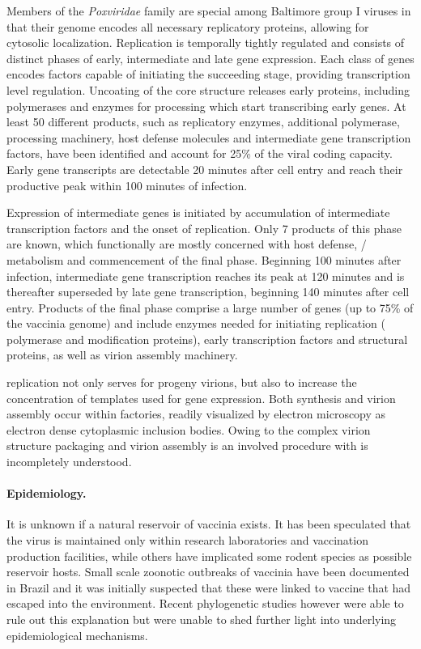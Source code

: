 Members of the \textit{Poxviridae} family are special among Baltimore group I viruses in that their genome encodes all necessary replicatory proteins, allowing for cytosolic localization. Replication is temporally tightly regulated and consists of distinct phases of early, intermediate and late gene expression. Each class of genes encodes factors capable of initiating the succeeding stage, providing transcription level regulation. Uncoating of the core structure releases early proteins, including  polymerases and enzymes for  processing which start transcribing early genes. At least 50 different products, such as  replicatory enzymes, additional  polymerase,  processing machinery, host defense molecules and intermediate gene transcription factors, have been identified and account for 25\% of the viral coding capacity. Early gene transcripts are detectable 20 minutes after cell entry and reach their productive peak within 100 minutes of infection.

Expression of intermediate genes is initiated by accumulation of intermediate  transcription factors and the onset of  replication. Only 7 products of this phase are known, which functionally are mostly concerned with host defense, \slash {} metabolism and commencement of the final phase. Beginning 100 minutes after infection, intermediate gene transcription reaches its peak at 120 minutes and is thereafter superseded by late gene transcription, beginning 140 minutes after cell entry. Products of the final phase comprise a large number of genes (up to 75\% of the vaccinia genome) and include enzymes needed for initiating replication ( polymerase and modification proteins), early transcription factors and structural proteins, as well as virion assembly machinery.

 replication not only serves for progeny virions, but also to increase the concentration of templates used for gene expression. Both  synthesis and virion assembly occur within factories, readily visualized by electron microscopy as electron dense cytoplasmic inclusion bodies. Owing to the complex virion structure  packaging and virion assembly is an involved procedure with is incompletely understood.

\paragraph{Epidemiology.}
It is unknown if a natural reservoir of vaccinia exists. It has been speculated that the virus is maintained only within research laboratories and vaccination production facilities, while others have implicated some rodent species as possible reservoir hosts. Small scale zoonotic outbreaks of vaccinia have been documented in Brazil and it was initially suspected that these were linked to vaccine that had escaped into the environment. Recent phylogenetic studies however were able to rule out this explanation but were unable to shed further light into underlying epidemiological mechanisms.

